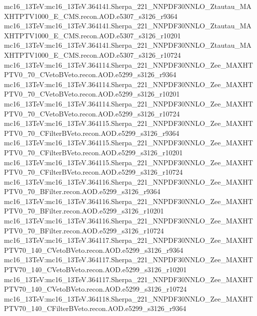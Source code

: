 { mc16\_13TeV:mc16\_13TeV.364141.Sherpa\_221\_NNPDF30NNLO\_Ztautau\_MAXHTPTV1000\_E\_CMS.recon.AOD.e5307\_s3126\_r9364  \newline 
 mc16\_13TeV:mc16\_13TeV.364141.Sherpa\_221\_NNPDF30NNLO\_Ztautau\_MAXHTPTV1000\_E\_CMS.recon.AOD.e5307\_s3126\_r10201 \newline 
 mc16\_13TeV:mc16\_13TeV.364141.Sherpa\_221\_NNPDF30NNLO\_Ztautau\_MAXHTPTV1000\_E\_CMS.recon.AOD.e5307\_s3126\_r10724 \newline  
 mc16\_13TeV:mc16\_13TeV.364114.Sherpa\_221\_NNPDF30NNLO\_Zee\_MAXHTPTV0\_70\_CVetoBVeto.recon.AOD.e5299\_s3126\_r9364  \newline 
 mc16\_13TeV:mc16\_13TeV.364114.Sherpa\_221\_NNPDF30NNLO\_Zee\_MAXHTPTV0\_70\_CVetoBVeto.recon.AOD.e5299\_s3126\_r10201  \newline 
 mc16\_13TeV:mc16\_13TeV.364114.Sherpa\_221\_NNPDF30NNLO\_Zee\_MAXHTPTV0\_70\_CVetoBVeto.recon.AOD.e5299\_s3126\_r10724 \newline  
 mc16\_13TeV:mc16\_13TeV.364115.Sherpa\_221\_NNPDF30NNLO\_Zee\_MAXHTPTV0\_70\_CFilterBVeto.recon.AOD.e5299\_s3126\_r9364 \newline  
 mc16\_13TeV:mc16\_13TeV.364115.Sherpa\_221\_NNPDF30NNLO\_Zee\_MAXHTPTV0\_70\_CFilterBVeto.recon.AOD.e5299\_s3126\_r10201 \newline  
 mc16\_13TeV:mc16\_13TeV.364115.Sherpa\_221\_NNPDF30NNLO\_Zee\_MAXHTPTV0\_70\_CFilterBVeto.recon.AOD.e5299\_s3126\_r10724 \newline  
 mc16\_13TeV:mc16\_13TeV.364116.Sherpa\_221\_NNPDF30NNLO\_Zee\_MAXHTPTV0\_70\_BFilter.recon.AOD.e5299\_s3126\_r9364 \newline  
 mc16\_13TeV:mc16\_13TeV.364116.Sherpa\_221\_NNPDF30NNLO\_Zee\_MAXHTPTV0\_70\_BFilter.recon.AOD.e5299\_s3126\_r10201  \newline 
 mc16\_13TeV:mc16\_13TeV.364116.Sherpa\_221\_NNPDF30NNLO\_Zee\_MAXHTPTV0\_70\_BFilter.recon.AOD.e5299\_s3126\_r10724 \newline  
 mc16\_13TeV:mc16\_13TeV.364117.Sherpa\_221\_NNPDF30NNLO\_Zee\_MAXHTPTV70\_140\_CVetoBVeto.recon.AOD.e5299\_s3126\_r9364 \newline  
 mc16\_13TeV:mc16\_13TeV.364117.Sherpa\_221\_NNPDF30NNLO\_Zee\_MAXHTPTV70\_140\_CVetoBVeto.recon.AOD.e5299\_s3126\_r10201 \newline  
 mc16\_13TeV:mc16\_13TeV.364117.Sherpa\_221\_NNPDF30NNLO\_Zee\_MAXHTPTV70\_140\_CVetoBVeto.recon.AOD.e5299\_s3126\_r10724 \newline  
 mc16\_13TeV:mc16\_13TeV.364118.Sherpa\_221\_NNPDF30NNLO\_Zee\_MAXHTPTV70\_140\_CFilterBVeto.recon.AOD.e5299\_s3126\_r9364 \newline  
}
